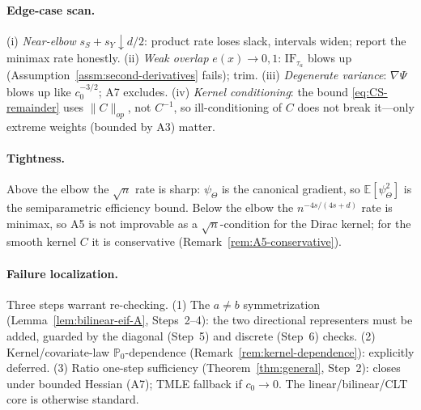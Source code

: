 \paragraph{Edge-case scan.}
(i) \emph{Near-elbow} $s_S+s_Y\downarrow d/2$: product rate loses slack, intervals widen; report
the minimax rate honestly. (ii) \emph{Weak overlap} $e(x)\to0,1$: $\mathrm{IF}_{\tau_a}$ blows up
(Assumption~\ref{assm:second-derivatives} fails); trim. (iii) \emph{Degenerate variance}: $\nabla\Psi$
blows up like $c_0^{-3/2}$; A7 excludes. (iv) \emph{Kernel conditioning}: the bound
\eqref{eq:CS-remainder} uses $\|C\|_{op}$, not $C^{-1}$, so ill-conditioning of $C$ does not break
it---only extreme weights (bounded by A3) matter.

\paragraph{Tightness.}
Above the elbow the $\sqrt n$ rate is sharp: $\psi_\Theta$ is the canonical gradient, so
$\mathbb{E}[\psi_\Theta^2]$ is the semiparametric efficiency bound. Below the elbow the
$n^{-4s/(4s+d)}$ rate is minimax, so A5 is not improvable as a $\sqrt n$-condition for the Dirac
kernel; for the smooth kernel $C$ it is conservative (Remark~\ref{rem:A5-conservative}).

\paragraph{Failure localization.}
Three steps warrant re-checking. (1) The $a\ne b$ symmetrization
(Lemma~\ref{lem:bilinear-eif-A}, Steps~2--4): the two directional representers must be added,
guarded by the diagonal (Step~5) and discrete (Step~6) checks. (2) Kernel/covariate-law
$\mathbb{P}_0$-dependence (Remark~\ref{rem:kernel-dependence}): explicitly deferred. (3) Ratio
one-step sufficiency (Theorem~\ref{thm:general}, Step~2): closes under bounded Hessian (A7); TMLE
fallback if $c_0\to0$. The linear/bilinear/CLT core is otherwise standard.
